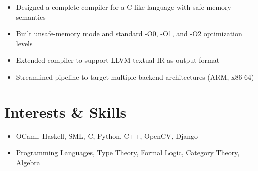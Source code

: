 \documentclass[12pt]{article}
\begin{document}
\begin{itemize}
\itemsep-2pt
\item Designed a complete compiler for a C-like language with safe-memory semantics
\item Built unsafe-memory mode and standard -O0, -O1, and -O2 optimization levels
\item Extended compiler to support LLVM textual IR as output format
\item Streamlined pipeline to target multiple backend architectures (ARM, x86-64)
\end{itemize}

% 

\section{Interests \& Skills}

\begin{itemize}
\itemsep-2pt
\item OCaml, Haskell, SML, C, Python, C++, OpenCV, Django
\item Programming Languages, Type Theory, Formal Logic, Category Theory, Algebra
\end{itemize}
\end{document}
